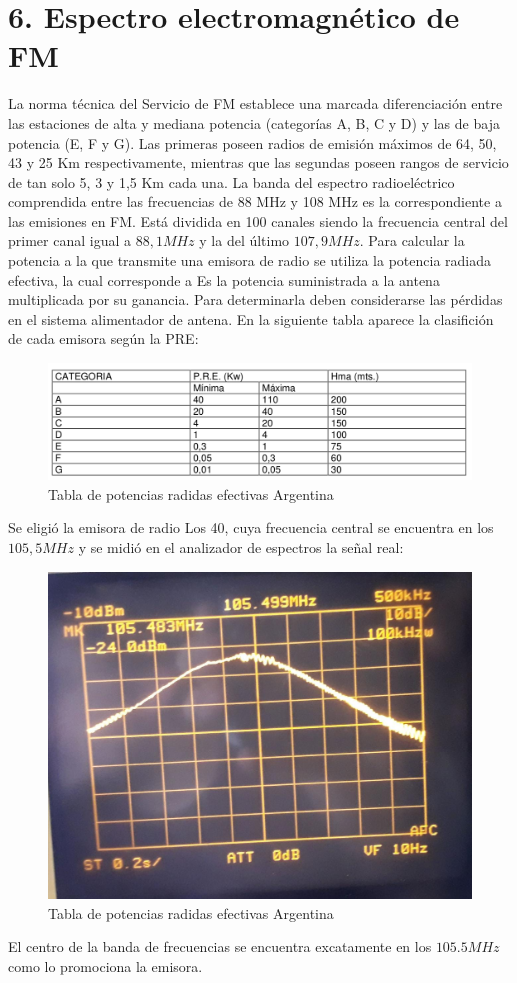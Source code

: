 \section{6. Espectro electromagn\'etico de FM}

La norma técnica del Servicio de FM establece una marcada diferenciación entre las estaciones de alta y mediana potencia (categorías A, B, C y D) y las de baja potencia (E, F y G). Las primeras poseen radios de emisión máximos de 64, 50, 43 y 25 Km respectivamente, mientras que las segundas poseen rangos de servicio de tan solo 5, 3 y 1,5  Km cada una. La banda del espectro radioeléctrico comprendida entre las frecuencias de 88 MHz y 108 MHz es la correspondiente a las emisiones en FM. Está dividida en 100 canales siendo la frecuencia central del primer canal igual a $88,1 MHz$ y la del último $107,9MHz$. Para calcular la potencia a la que transmite una emisora de radio se utiliza la potencia radiada efectiva, la cual corresponde a Es la potencia suministrada a la antena multiplicada por su ganancia. Para determinarla deben considerarse las pérdidas en el sistema alimentador de antena. En la siguiente tabla aparece la clasifición de cada emisora según la PRE:



\begin{figure}[H]
    \centering
    \includegraphics[scale=0.3]{Recursos/potencias.png}
    \caption{Tabla de potencias radidas efectivas Argentina}
\end{figure}

Se eligió la emisora de radio Los 40, cuya frecuencia central se encuentra en los $105,5MHz$ y se midió en el analizador de espectros la señal real:




\begin{figure}[H]
    \centering
    \includegraphics[scale=0.3]{Recursos/los40.jpeg}
    \caption{Tabla de potencias radidas efectivas Argentina}
\end{figure}

El centro de la banda de frecuencias se encuentra excatamente en los $105.5MHz$ como lo promociona la emisora. 